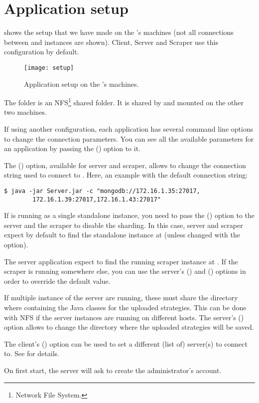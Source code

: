 \chapter{Application setup}\label{appendix:setup}

 shows the setup that we have made on the \theinstitute's
machines (not all connections between  and  instances
are shown). Client, Server and Scraper use this configuration by default.

\begin{figure}[htb]
	\texttt{[image: setup]}
	\caption{Application setup on the \theinstitute's
	machines.}\label{fig:setup}
\end{figure}

The  folder is an NFS\footnote{Network File System.}
shared folder. It is shared by  and mounted on the other two
machines.

If using another configuration, each application has several command line
options to change the connection parameters. You can see all the available
parameters for an application by passing the  () option to
it.

The  () option, available for server and
scraper, allows to change the connection string used to connect to \mongodb.
Here, an example with the default connection string:
\begin{verbatim}
$ java -jar Server.jar -c "mongodb://172.16.1.35:27017,
        172.16.1.39:27017,172.16.1.43:27017"
\end{verbatim}

If \mongodb{} is running as a single standalone instance, you need to pass the
 () option to the server and the scraper to disable
the sharding. In this case, server and scraper expect by default to find the
standalone  instance at  (unless changed with
the  option).

The server application expect to find the running scraper instance at
. If the scraper is running somewhere else, you can use
the server's  () and 
() options in order to override the default value.

If multiple instance of the server are running, these must share the directory
where containing the Java classes for the uploaded strategies. This can be done
with NFS if the server instances are running on different hosts. The server's
 () option allows to change the directory where
the uploaded strategies will be saved.

The client's  () option can be used to set a different
(list of) server(s) to connect to. See  for details.

On first start, the server will ask to create the administrator's account.
